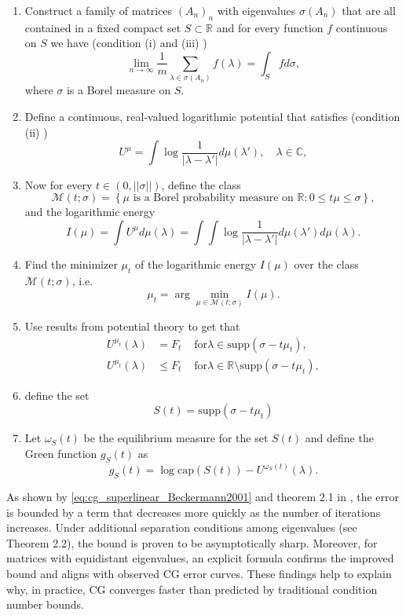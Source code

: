 \begin{enumerate}
    \item Construct a family of matrices $(A_n)_n$ with eigenvalues $\sigma(A_n)$ that are all contained in a fixed compact set $S\subset\mathbb{R}$ and for every function $f$ continuous on $S$ we have (condition (i) and (iii) \cite[Equation 2.1]{cg_superlinear_Beckermann2001})
    \[
        \lim_{n\to\infty}\frac{1}{m}\sum_{\lambda\in\sigma(A_n)}f(\lambda) = \int_S f d\sigma,
    \]
    where $\sigma$ is a Borel measure on $S$.
    \item Define a continuous, real-valued logarithmic potential that satisfies (condition (ii) \cite[Equation 2.1]{cg_superlinear_Beckermann2001})
    \[
        U^{\mu} = \int \log \frac{1}{|\lambda-\lambda'|} d\mu(\lambda'), \quad \lambda \in \mathbb{C},
    \]
    \item Now for every $t\in(0, ||\sigma||)$, define the class
    \[
        \mathcal{M}(t;\sigma) = \left\{\mu\text{ is a Borel probability measure on } \mathbb{R} : 0 \leq t\mu \leq \sigma \right\},
    \]
    and the logarithmic energy
    \[
        I(\mu) = \int U^{\mu} d\mu(\lambda) = \int \int \log \frac{1}{|\lambda-\lambda'|} d\mu(\lambda') d\mu(\lambda).
    \]
    \item Find the minimizer $\mu_t$ of the logarithmic energy $I(\mu)$ over the class $\mathcal{M}(t;\sigma)$, i.e.
    \[
        \mu_t = \arg\min_{\mu\in\mathcal{M}(t;\sigma)} I(\mu).
    \]
    \item Use results from potential theory \citehere to get that
    \[
        \begin{aligned}
            U^{\mu_t}(\lambda) &= F_t &\text{ for} \lambda \in \text{supp}(\sigma - t\mu_t),\\
            U^{\mu_t}(\lambda) &\leq F_t &\text{ for} \lambda \in \mathbb{R}\setminus\text{supp}(\sigma - t\mu_t),
        \end{aligned}
    \]
    \item define the set
    \[
        S(t) = \text{supp}(\sigma - t\mu_t)
    \]
    \item Let $\omega_S(t)$ be the equilibrium measure for the set $S(t)$ and define the Green function $g_S(t)$ as
    \[
        g_S(t) = \log \text{cap}(S(t)) - U^{\omega_S(t)}(\lambda).
    \]
\end{enumerate}

As shown by \cref{eq:cg_superlinear_Beckermann2001} and theorem 2.1 in \cite{cg_sharp_bound_Beckermann2001}, the error is bounded by a term that decreases more quickly as the number of iterations increases. Under additional separation conditions among eigenvalues (see Theorem 2.2), the bound is proven to be asymptotically sharp. Moreover, for matrices with equidistant eigenvalues, an explicit formula \cite[Corollary 3.2 and Equation 3.11]{cg_superlinear_Beckermann2001} confirms the improved bound and aligns with observed CG error curves. These findings help to explain why, in practice, CG converges faster than predicted by traditional condition number bounds.

